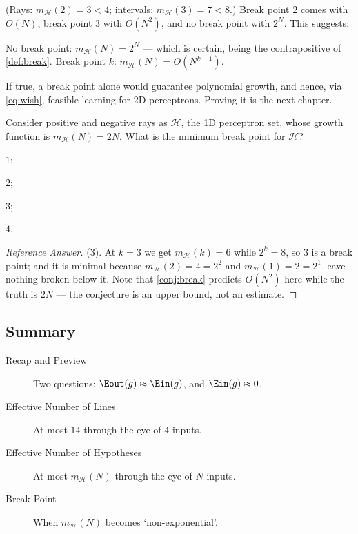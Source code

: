 (Rays: \(m_{\mathcal{H}}(2) = 3 < 4\); intervals:
\(m_{\mathcal{H}}(3) = 7 < 8\).) Break point \(2\) comes with \(O(N)\), break
point \(3\) with \(O(N^2)\), and no break point with \(2^N\). This suggests:

\begin{conjecture}\label{conj:break}
    No break point: \(m_{\mathcal{H}}(N) = 2^N\) --- which is certain, being the
    contrapositive of \autoref{def:break}. Break point \(k\):
    \(m_{\mathcal{H}}(N) = O \! \left( N^{k-1} \right)\).
\end{conjecture}

If true, a break point alone would guarantee polynomial growth, and hence,
via \autoref{eq:wish}, feasible learning for 2D perceptrons. Proving it is the
next chapter.

\begin{exercise}
    Consider positive and negative rays as \(\mathcal{H}\), the 1D perceptron
    set, whose growth function is \(m_{\mathcal{H}}(N) = 2N\). What is the
    minimum break point for \(\mathcal{H}\)?
    \begin{enumerate*}[(1)]
        \item \(1\); \item \(2\); \item \(3\); \item \(4\).
    \end{enumerate*}
\end{exercise}

\begin{proof}[Reference Answer]
    (3). At \(k = 3\) we get \(m_{\mathcal{H}}(k) = 6\) while \(2^k = 8\), so
    \(3\) is a break point; and it is minimal because \(m_{\mathcal{H}}(2) = 4 =
    2^2\) and \(m_{\mathcal{H}}(1) = 2 = 2^1\) leave nothing broken below it.
    Note that \autoref{conj:break} predicts \(O(N^2)\) here while the truth is
    \(2N\) --- the conjecture is an upper bound, not an estimate.
\end{proof}

\hrulebar

\subsection*{Summary}

\begin{description}
    \item[Recap and Preview] Two questions: \(\Eout(g) \approx \Ein(g)\), and
        \(\Ein(g) \approx 0\).
    \item[Effective Number of Lines] At most \(14\) through the eye of \(4\)
        inputs.
    \item[Effective Number of Hypotheses] At most \(m_{\mathcal{H}}(N)\) through
        the eye of \(N\) inputs.
    \item[Break Point] When \(m_{\mathcal{H}}(N)\) becomes `non-exponential'.
\end{description}

